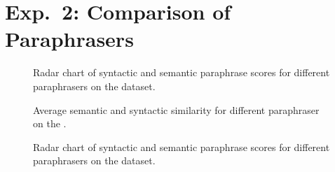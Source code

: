\section{Exp.\ 2: Comparison of Paraphrasers}
\label{sec:app_paraphrases}

\begin{figure}[H]
    \centering
    
    \caption[Paraphrase evaluation radar chart on the \dataBlog{} dataset]{Radar chart of syntactic and semantic paraphrase scores for different paraphrasers on the \dataBlog{} dataset.}
    \label{fig:radar_blog}
\end{figure}


\begin{figure}[H]
    \centering
    
    \caption[Comparison of paraphrasers on the \dataGutenberg{} dataset]{Average semantic and syntactic similarity for different paraphraser on the \dataGutenberg{}.}
    \label{fig:sem_syn_gutenberg}
\end{figure}

\begin{figure}[H]
    \centering
    
    \caption[Paraphrase evaluation radar chart on the \dataGutenberg{} dataset]{Radar chart of syntactic and semantic paraphrase scores for different paraphrasers on the \dataGutenberg{} dataset.}
    \label{fig:radar_gutenberg}
\end{figure}

